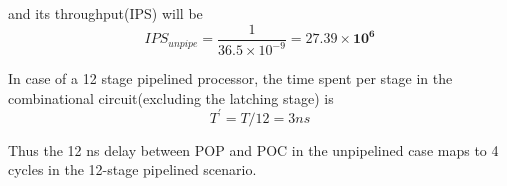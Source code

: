 \documentclass{tufte-handout}
\begin{document}
	and its throughput(IPS) will be 
	\[
		IPS_{unpipe} = \dfrac{1}{36.5 \times 10^{-9}} = \mathbf{27.39 \times 10^6}
	\]

	In case of a 12 stage pipelined processor, the time spent per stage in the combinational circuit(excluding the latching stage) is
	\[
		T^\prime = T/12 = 3ns
	\]

	Thus the 12 ns delay between POP and POC in the unpipelined case maps to 4 cycles in the 12-stage pipelined scenario.


		
  
  
  
  
\end{document}
